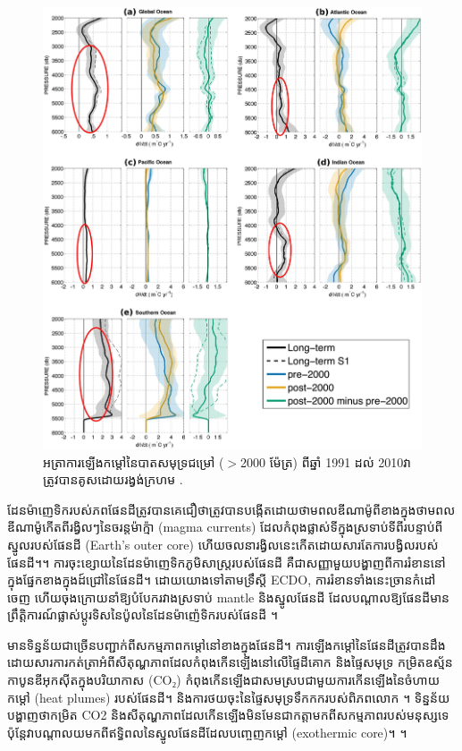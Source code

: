 \documentclass[10pt,twocolumn,letterpaper]{article}
\begin{document}
\begin{figure}[t]
\begin{center}
   \includegraphics[width=1\linewidth]{ocean-highlight.jpg}
\end{center}
   \caption{អត្រាការឡើងកម្តៅនៃបាតសមុទ្រជម្រៅ ($>$2000 ម៉ែត្រ) ពីឆ្នាំ 1991 ដល់ 2010​វាត្រូវបានគូសដោយរង្វង់ក្រហម \cite{132}.}
\label{fig:15}
\label{fig:onecol}
\end{figure}

ដែនម៉ាញេទិករបស់ភពផែនដីត្រូវបានគេជឿថាត្រូវបានបង្កើតដោយថាមពលឌីណាម៉ូពីខាងក្នុង​ថាមពលឌីណាម៉ូកើតពីរង្វិលៗនៃចរន្តម៉ាក្ម៉ា (magma currents) ដែលកំពុងផ្លាស់ទីក្នុងស្រទាប់ទីពីរបន្ទាប់ពីស្នូលរបស់ផែនដី (Earth’s outer core) ហើយចលនារង្វិលនេះកើតដោយសារតែការបង្វិលរបស់ផែនដី។\cite{123}។ ការចុះខ្សោយនៃដែនម៉ាញេទិកភូមិសាស្ត្ររបស់ផែនដី គឺជាសញ្ញាមួយបង្ហាញពីការរំខាននៅក្នុងផ្នែកខាងក្នុងដ៍ជ្រៅនៃផែនដី។ ដោយយោងទៅតាមទ្រឹស្តី ECDO, ការរំខានទាំងនេះច្រានកំដៅចេញ ហើយចុងក្រោយនាំឱ្យបំបែករវាងស្រទាប់ mantle និងស្នូលផែនដី ដែលបណ្ដាលឱ្យផែនដីមានព្រឹត្តិការណ៍ផ្លាស់ប្តូរទិសនៃប៉ូលនៃដែនម៉ាញ៉េទិករបស់ផែនដី \cite{1}។

មានទិន្នន័យជាច្រើនបញ្ជាក់ពីសកម្មភាពកម្ដៅនៅខាងក្នុងផែនដី។ ការឡើងកម្តៅនៃផែនដីត្រូវបានដឹងដោយសារការកត់ត្រាអំពីសីតុណ្ហភាពដែលកំពុងកើនឡើងនៅលើផ្ទៃដីគោក និងផ្ទៃសមុទ្រ\cite{127,128} កម្រិតឧស្ម័នកាបូនឌីអុកស៊ីតក្នុងបរិយាកាស (CO₂) កំពុងកើនឡើងជាសមស្របជាមួយការកើនឡើងនៃចំហាយកម្ដៅ (heat plumes) របស់ផែនដី។ \cite{129,130} និងការថយចុះនៃផ្ទៃសមុទ្រទឹកកករបស់ពិភពលោក \cite{131}។ ទិន្នន័យបង្ហាញថាកម្រិត CO2 និងសីតុណ្ហភាពដែលកើនឡើងមិនមែនជាកត្តាមកពីសកម្មភាពរបស់មនុស្សទេ ប៉ុន្តែវាបណ្តាលយមកពីឥទ្ធិពលនៃស្នូលផែនដីដែលបញ្ចេញកម្ដៅ (exothermic core)។ \cite{129}។
\end{document}
